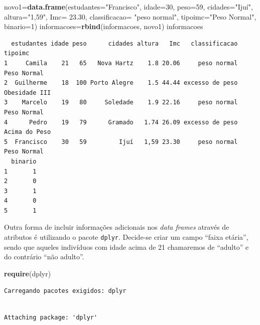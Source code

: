 \documentclass[12pt,brazil,oneside]{book}
\newenvironment{Shaded}{\begin{snugshade}}{\end{snugshade}}
\newcommand{\DataTypeTok}[1]{\textcolor[rgb]{0.13,0.29,0.53}{#1}}
\newcommand{\DecValTok}[1]{\textcolor[rgb]{0.00,0.00,0.81}{#1}}
\newcommand{\FloatTok}[1]{\textcolor[rgb]{0.00,0.00,0.81}{#1}}
\newcommand{\KeywordTok}[1]{\textcolor[rgb]{0.13,0.29,0.53}{\textbf{#1}}}
\newcommand{\NormalTok}[1]{#1}
\newcommand{\StringTok}[1]{\textcolor[rgb]{0.31,0.60,0.02}{#1}}
\begin{document}
\begin{Shaded}
\begin{Highlighting}[]
\NormalTok{novo1=}\KeywordTok{data.frame}\NormalTok{(}\DataTypeTok{estudantes=}\StringTok{"Francisco"}\NormalTok{, }\DataTypeTok{idade=}\DecValTok{30}\NormalTok{, }\DataTypeTok{peso=}\DecValTok{59}\NormalTok{, }
                 \DataTypeTok{cidades=}\StringTok{"Ijuí"}\NormalTok{, }
                 \DataTypeTok{altura=}\StringTok{"1,59"}\NormalTok{, }
                 \DataTypeTok{Imc=} \FloatTok{23.30}\NormalTok{, }
                 \DataTypeTok{classificacao=} \StringTok{"peso normal"}\NormalTok{,}
                 \DataTypeTok{tipoimc=}\StringTok{"Peso Normal"}\NormalTok{, }
                 \DataTypeTok{binario=}\DecValTok{1}\NormalTok{)}
\NormalTok{informacoes=}\KeywordTok{rbind}\NormalTok{(informacoes, novo1)}
\NormalTok{informacoes}
\end{Highlighting}
\end{Shaded}

\begin{verbatim}
  estudantes idade peso      cidades altura   Imc   classificacao       tipoimc
1     Camila    21   65   Nova Hartz    1.8 20.06     peso normal   Peso Normal
2  Guilherme    18  100 Porto Alegre    1.5 44.44 excesso de peso Obesidade III
3    Marcelo    19   80     Soledade    1.9 22.16     peso normal   Peso Normal
4      Pedro    19   79      Gramado   1.74 26.09 excesso de peso Acima do Peso
5  Francisco    30   59         Ijuí   1,59 23.30     peso normal   Peso Normal
  binario
1       1
2       0
3       1
4       0
5       1
\end{verbatim}

Outra forma de incluir informações adicionais nos \emph{data frames}
através de atributos é utilizando o pacote \texttt{dplyr}. Decide-se
criar um campo ``faixa etária'', sendo que aqueles indivíduos com idade
acima de 21 chamaremos de ``adulto'' e do contrário ``não adulto''.

\begin{Shaded}
\begin{Highlighting}[]
\KeywordTok{require}\NormalTok{(dplyr)}
\end{Highlighting}
\end{Shaded}

\begin{verbatim}
Carregando pacotes exigidos: dplyr
\end{verbatim}

\begin{verbatim}

Attaching package: 'dplyr'
\end{verbatim}
\end{document}

